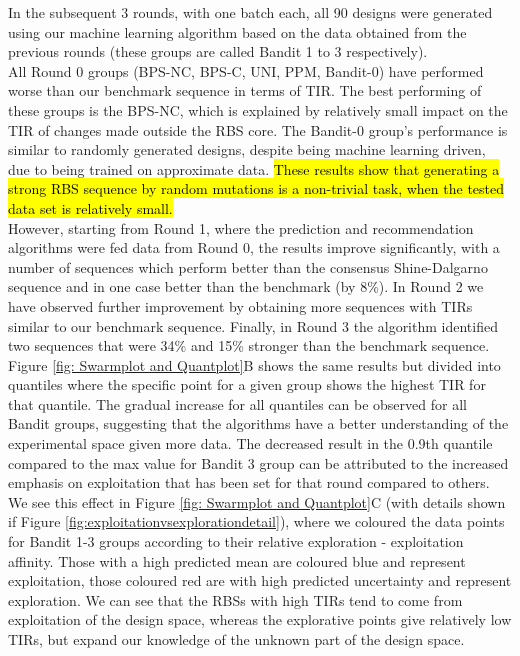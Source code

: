 \documentclass{article}
\begin{document}
In the subsequent 3 rounds, with one batch each, all 90 designs were generated using our machine learning algorithm based on the data obtained from the previous rounds (these groups are called Bandit 1 to 3 respectively).\\

All Round 0 groups (BPS-NC, BPS-C, UNI, PPM, Bandit-0) have performed worse than our benchmark sequence in terms of TIR. 
The best performing of these groups is the BPS-NC, which is explained by relatively small impact on the TIR of changes made outside the RBS core. 
The Bandit-0 group's performance is similar to randomly generated designs, despite being machine learning driven, due to being trained on approximate data.
\hl{These results show that generating a strong RBS sequence by random mutations is a non-trivial task, when the tested data set is relatively small.}\\

However, starting from Round 1, where the prediction and recommendation algorithms were fed data from Round 0, the results improve significantly, with a number of sequences which perform better than the consensus Shine-Dalgarno sequence and in one case better than the benchmark (by 8\%).
In Round 2 we have observed further improvement by obtaining more sequences with TIRs similar to our benchmark sequence.
Finally, in Round 3 the algorithm identified two sequences that were 34\% and 15\% stronger than the benchmark sequence.\\

Figure \ref{fig: Swarmplot and Quantplot}B shows the same results but divided into quantiles where the specific point for a given group shows the highest TIR for that quantile.
The gradual increase for all quantiles can be observed for all Bandit groups, suggesting that the algorithms have a better understanding of the experimental space given more data.
The decreased result in the 0.9th quantile compared to the max value for Bandit 3 group can be attributed to the increased emphasis on exploitation that has been set for that round compared to others.
We see this effect in Figure \ref{fig: Swarmplot and Quantplot}C (with details shown if Figure  \ref{fig:exploitationvsexplorationdetail}), where we coloured the data points for Bandit 1-3 groups according to their relative exploration - exploitation affinity.
Those with a high predicted mean are coloured blue and represent exploitation, those coloured red are with high predicted uncertainty and represent exploration.
We can see that the RBSs with high TIRs tend to come from exploitation of the design space, whereas the explorative points give relatively low TIRs, but expand our knowledge of the unknown part of the design space.\\
\end{document}
